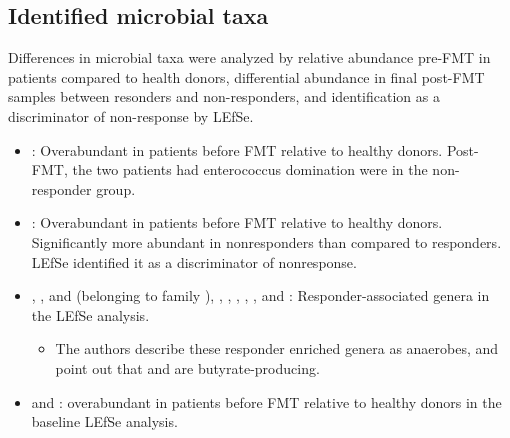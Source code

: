 \documentclass[11pt,a4paper]{article}
\begin{document}
\subsection{Identified microbial taxa}
Differences in microbial taxa were analyzed by relative abundance pre-FMT in patients compared to health donors, differential abundance in final post-FMT samples between resonders and non-responders, and identification as a discriminator of non-response by LEfSe. 
\begin{itemize}
\item \taxEnterococcus: Overabundant in patients before FMT relative to healthy donors. Post-FMT, the two patients had enterococcus domination were in the non-responder group.
\item \taxLactobacillus: Overabundant in patients before FMT relative to healthy donors. Significantly more abundant in nonresponders than compared to responders. LEfSe identified it as a discriminator of nonresponse.
\item \taxOscillibacter, \taxSubdoligranulum, and \taxButyricicoccus (belonging to family \taxRuminococcaceae), \taxBlautia, \taxLachnoclostridium, \taxCoprobacter, \taxParabacteroides, \taxClostridiumInnocuumGroup, and \taxAlistipes: Responder-associated genera in the LEfSe analysis.
\begin{itemize}
    \item The authors describe these responder enriched genera as anaerobes, and point out that \taxBlautia and \taxRuminococcaceae are butyrate-producing. 
\end{itemize}
\item \taxCampylobacter and \taxStaphylococcus: overabundant in patients before FMT relative to healthy donors in the baseline LEfSe analysis.
\end{itemize}
\end{document}
